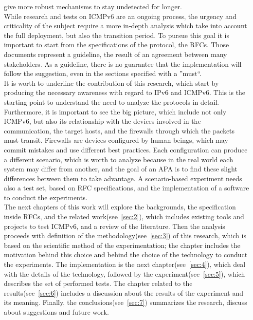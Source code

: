 \documentclass[12pt]{article}
\begin{document}
give more robust mechanisms to stay undetected for longer.\\
While research and tests on ICMPv6 are an ongoing process, the urgency and criticality of the subject require a more in-depth analysis which take into account the full deployment, but also the transition period. To 
pursue this goal it is important to start from the specifications of the protocol, the RFCs. Those documents represent a guideline, the result of an agreement between many stakeholders. As a guideline, there is no 
guarantee that the implementation will follow the suggestion, even in the sections specified with a ''must``.\\
It is worth to underline the contribution of this research, which start by producing the necessary awareness with regard to IPv6 and ICMPv6. This is the starting point to understand the need to analyze the protocols in 
detail. Furthermore, it is important to see the big picture, which include not only ICMPv6, but also its relationship with the devices involved in the communication, the target hosts, and the firewalls through which the 
packets must transit. Firewalls are devices configured by human beings, which may commit mistakes and use different best practices. Each configuration can produce a different scenario, which is worth to analyze because 
in the real world each system may differ from another, and the goal of an APA is to find these slight differences between them to take advantage. A scenario-based experiment needs also a test set, based on RFC specifications,
and the implementation of a software to conduct the experiments.\\
The next chapters of this work will explore the backgrounds, the specification inside RFCs, and the related work(see~\ref{sec:2}), which includes existing tools and projects to test ICMPv6, and a review of the literature.
Then the analysis proceeds with definition of the methodology(see~\ref{sec:3}) of this research, which is based on the scientific method of the experimentation; the chapter includes the motivation behind this choice and 
behind the choice of the technology to conduct the experiments. The implementation is the next chapter(see~\ref{sec:4}), which deal with the details of the technology, followed by the experiment(see~\ref{sec:5}), which 
describes the set of performed tests. The chapter related to the results(see~\ref{sec:6}) includes a discussion about the results of the experiment and its meaning. Finally, the conclusions(see~\ref{sec:7}) summarizes the 
research, discuss about suggestions and future work.
\end{document}
